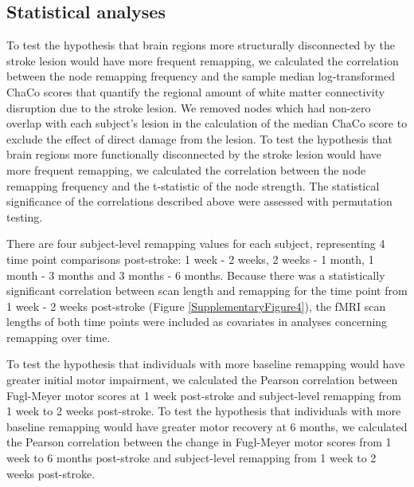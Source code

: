 \documentclass[phd,tocprelim]{cornell}
\begin{document}
	\subsection{Statistical analyses}
	To test the hypothesis that brain regions more structurally disconnected by the stroke lesion would have more frequent remapping, we calculated the correlation between the node remapping frequency and the sample median log-transformed ChaCo scores that quantify the regional amount of white matter connectivity disruption due to the stroke lesion. We removed nodes which had non-zero overlap with each subject's lesion in the calculation of the median ChaCo score to exclude the effect of direct damage from the lesion. To test the hypothesis that brain regions more functionally disconnected by the stroke lesion would have more frequent remapping, we calculated the correlation between the node remapping frequency and the t-statistic of the node strength. The statistical significance of the correlations described above were assessed with permutation testing. 
	
	There are four subject-level remapping values for each subject, representing 4 time point comparisons post-stroke: 1 week - 2 weeks, 2 weeks - 1 month, 1 month - 3 months and 3 months - 6 months. Because there was a statistically significant correlation between scan length and remapping for the time point from 1 week - 2 weeks post-stroke (Figure \ref{SupplementaryFigure4}), the fMRI scan lengths of both time points were included as covariates in analyses concerning remapping over time. 
	
	To test the hypothesis that individuals with more baseline remapping would have greater initial motor impairment, we calculated the Pearson correlation between Fugl-Meyer motor scores at 1 week post-stroke and subject-level remapping from 1 week to 2 weeks post-stroke. To test the hypothesis that individuals with more baseline remapping would have greater motor recovery at 6 months, we calculated the Pearson correlation between the change in Fugl-Meyer motor scores from 1 week to 6 months post-stroke and subject-level remapping from 1 week to 2 weeks post-stroke. 
	
\end{document}
